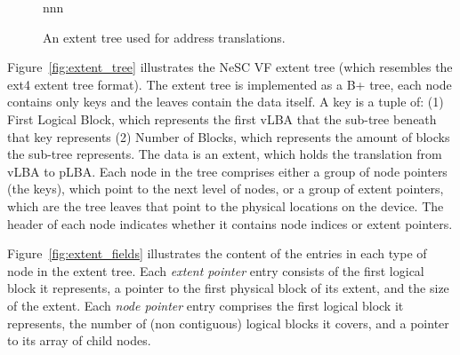 \begin{figure}[t]
  \centering
      nnn

      \caption{An extent tree used for address translations.\label{fig:extent}}

\end{figure}

Figure~\ref{fig:extent_tree} illustrates the NeSC VF extent tree (which resembles the ext4 extent tree format). The extent tree is implemented as a B+ tree, each node contains only keys and the leaves contain the data itself.
A key is a tuple of: (1) First Logical Block, which represents the first vLBA that the sub-tree beneath that key represents (2) Number of Blocks, which represents the amount of blocks the sub-tree represents. The data is an extent, which holds the translation from vLBA to pLBA. 
Each node in the tree comprises either a group of node pointers (the keys), which point to the next level of nodes, or a group of extent pointers, which are the tree leaves that point to the physical locations on the device. The header of each node indicates whether it contains node indices or extent pointers.

Figure~\ref{fig:extent_fields} illustrates the content of the entries in each type of node in the extent tree. Each \emph{extent pointer} entry consists of the first logical block it represents, a pointer to the first physical block of its extent, and the size of the extent. Each \emph{node pointer} entry comprises the first logical block it represents, the number of (non contiguous) logical blocks it covers, and a pointer to its array of child nodes.

